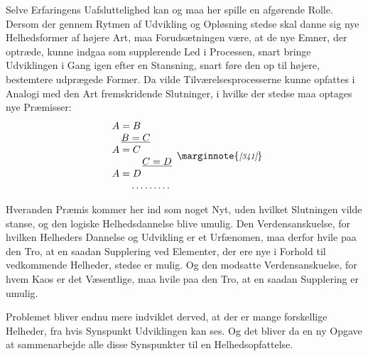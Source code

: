\documentclass[12pt,a4paper]{book}
\newcommand{\opage}[1]{\marginnote{\footnotesize\textit{[#1]}}}
\begin{document}
Selve Erfaringens Uafsluttelighed kan og maa her spille en afgørende Rolle. Dersom der
gennem Rytmen af Udvikling og Opløsning stedse skal danne sig nye Helhedsformer af højere
Art, maa Forudsætningen være, at de nye Emner, der optræde, kunne indgaa som supplerende
Led i Processen, snart bringe Udviklingen i Gang igen efter en Stansning, snart føre den
op til højere, bestemtere udprægede Former. Da vilde Tilværelsesprocesserne kunne opfattes
i Analogi med den Art fremskridende Slutninger, i hvilke der stedse maa optages nye
Præmisser:
\[
\begin{array}{l}
A = B\\
\hphantom{A}\,\underline{B = C}\\
A = C\\
\hphantom{A = C}\,\underline{C = D}\\
A = D\\
\hphantom{A = }\ldots\ldots\ldots
\end{array} \opage{341}
\]

Hveranden Præmis kommer her ind som noget Nyt, uden hvilket Slutningen vilde stanse, og den
logiske Helhedsdannelse blive umulig. Den Verdensanskuelse, for hvilken Helheders Dannelse
og Udvikling er et Urfænomen, maa derfor hvile paa den Tro, at en saadan Supplering ved
Elementer, der ere nye i Forhold til vedkommende Helheder, stedse er mulig. Og den modsatte
Verdensanskuelse, for hvem Kaos er det Væsentlige, maa hvile paa den Tro, at en saadan
Supplering er umulig.

Problemet bliver endnu mere indviklet derved, at der er mange forskellige Helheder, fra
hvis Synspunkt Udviklingen kan ses. Og det bliver da en ny Opgave at sammenarbejde alle disse
Synspunkter til en Helhedsopfattelse.
\end{document}
